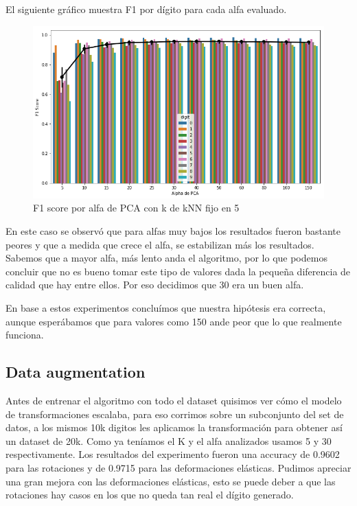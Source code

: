 El siguiente gráfico muestra F1 por dígito para cada alfa evaluado.

\begin{figure}[H]
    \begin{center}
      \includegraphics[width=0.8\columnwidth]{imagenes/F1_per_digit.png}
      \caption{F1 score por alfa de PCA con k de kNN fijo en 5}
    \end{center}
\end{figure}

En este caso se observó que para alfas muy bajos los resultados fueron bastante peores y que a medida que crece el alfa, se estabilizan más los resultados. 
Sabemos que a mayor alfa, más lento anda el algoritmo, por lo que podemos concluir que no es bueno tomar este tipo de valores dada la pequeña diferencia de calidad que hay entre ellos. Por eso decidimos que 30 era un buen alfa.

En base a estos experimentos concluímos que nuestra hipótesis era correcta, aunque esperábamos que para valores como 150 ande peor que lo que realmente funciona.

\subsection{Data augmentation}

Antes de entrenar el algoritmo con todo el dataset quisimos ver cómo el modelo de transformaciones escalaba, para eso corrimos sobre un subconjunto del set de datos, a los mismos 10k digitos les aplicamos la transformación para obtener así un dataset de 20k. Como ya teníamos el K y el alfa analizados usamos 5 y 30 respectivamente. Los resultados del experimento fueron una accuracy de 0.9602 para las rotaciones y de 0.9715 para las deformaciones elásticas. Pudimos apreciar una gran mejora con las deformaciones elásticas, esto se puede deber a que las rotaciones hay casos en los que no queda tan real el dígito generado.